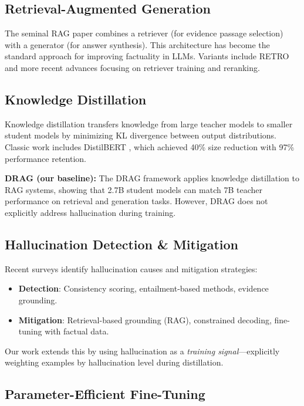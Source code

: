 \documentclass[11pt,a4paper]{article}
\begin{document}
\subsection{Retrieval-Augmented Generation}

The seminal RAG paper \cite{rag_lewis} combines a retriever (for evidence passage selection) with a generator (for answer synthesis). This architecture has become the standard approach for improving factuality in LLMs. Variants include RETRO \cite{retro} and more recent advances focusing on retriever training and reranking.

\subsection{Knowledge Distillation}

Knowledge distillation \cite{distillation_hinton} transfers knowledge from large teacher models to smaller student models by minimizing KL divergence between output distributions. Classic work includes DistilBERT \cite{distilbert}, which achieved 40\% size reduction with 97\% performance retention.

\textbf{DRAG (our baseline):} The DRAG framework \cite{drag_2025} applies knowledge distillation to RAG systems, showing that 2.7B student models can match 7B teacher performance on retrieval and generation tasks. However, DRAG does not explicitly address hallucination during training.

\subsection{Hallucination Detection \& Mitigation}

Recent surveys \cite{hallucination_comprehensive} identify hallucination causes and mitigation strategies:
\begin{itemize}
    \item \textbf{Detection}: Consistency scoring, entailment-based methods, evidence grounding.
    \item \textbf{Mitigation}: Retrieval-based grounding (RAG), constrained decoding, fine-tuning with factual data.
\end{itemize}

Our work extends this by using hallucination as a \textit{training signal}—explicitly weighting examples by hallucination level during distillation.

\subsection{Parameter-Efficient Fine-Tuning}
\end{document}
